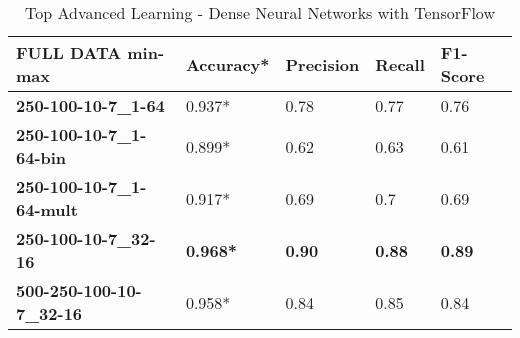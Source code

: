 \documentclass[10pt, conference, compsocconf]{IEEEtran}
\begin{document}
\begin{center}
	\begin{table}[t]
		\centering \footnotesize
		\vspace{0.01cm}
		\caption{Top Advanced Learning - Dense Neural Networks with TensorFlow}
		\hspace{1cm}
		\begin{tabularx}{\linewidth}{ l  X  X  X  X }
			\hline
			\textbf{FULL DATA min-max} &	\textbf{Accuracy*}&	\textbf{Precision}&	\textbf{Recall}&	\textbf{F1-Score} \\ \hline
			
			
			\textbf{250-100-10-7\_1-64}&	0.937*	&0.78&	0.77&	0.76\\ \hline
			\textbf{250-100-10-7\_1-64-bin}&	0.899*&	0.62&	0.63&	0.61\\ \hline
			\textbf{250-100-10-7\_1-64-mult}&	0.917*	&0.69&	0.7&	0.69\\ \hline
			\textbf{250-100-10-7\_32-16}&	\textbf{0.968*}&	\textbf{0.90}&	\textbf{0.88}&	\textbf{0.89}\\ \hline
			\textbf{500-250-100-10-7\_32-16}&	0.958*&	0.84&	0.85&	0.84\\ \hline
			
			
		\end{tabularx}\newline
		\vspace{-0.05cm}
		\label{Table8}
	\end{table} \hfil
\end{center}


%
%
\end{document}
